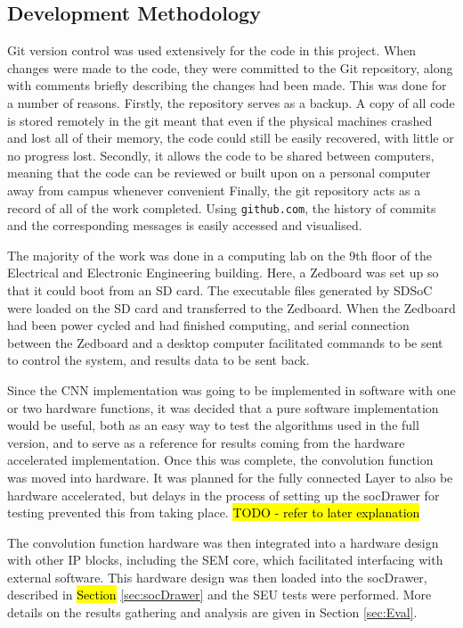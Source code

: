 \documentclass[12pt]{article}
\begin{document}
\subsection{Development Methodology}
\label{sec:Imp-Devlopment}

Git version control was used extensively for the code in this project. When changes were made to the code, they were committed to the Git repository, along with comments briefly describing the changes had been made. This was done for a number of reasons. Firstly, the repository serves as a backup. A copy of all code is stored remotely in the git meant that even if the physical machines crashed and lost all of their memory, the code could still be easily recovered, with little or no progress lost. Secondly, it allows the code to be shared between computers, meaning that the code can be reviewed or built upon on a personal computer away from campus whenever convenient Finally, the git repository acts as a record of all of the work completed. Using \lstinline|github.com|, the history of commits and the corresponding messages is easily accessed and visualised. 

The majority of the work was done in a computing lab on the 9th floor of the Electrical and Electronic Engineering building. Here, a Zedboard was set up so that it could boot from an SD card. The executable files generated by SDSoC were loaded on the SD card and transferred to the Zedboard. When the Zedboard had been power cycled and had finished computing, and serial connection between the Zedboard and a desktop computer facilitated commands to be sent to control the system, and results data to be sent back.

Since the CNN implementation was going to be implemented in software with one or two hardware functions, it was decided that a pure software implementation would be useful, both as an easy way to test the algorithms used in the full version, and to serve as a reference for results coming from the hardware accelerated implementation. Once this was complete, the convolution function was moved into hardware. It was planned for the fully connected Layer to also be hardware accelerated, but delays in the process of setting up the socDrawer for testing prevented this from taking place. \hl{TODO - refer to later explanation}

The convolution function hardware was then integrated into a hardware design with other IP blocks, including the SEM core, which facilitated interfacing with external software. This hardware design was then loaded into the socDrawer, described in \hl{Section} \ref{sec:socDrawer} and the SEU tests were performed. More details on the results gathering and analysis are given in Section \ref{sec:Eval}.
\end{document}
